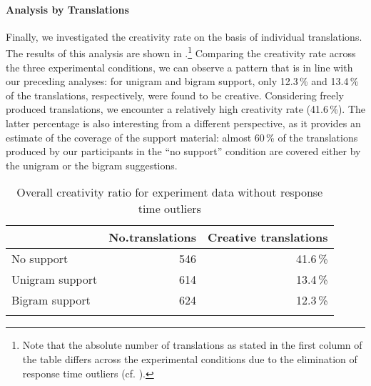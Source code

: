 \documentclass[output=paper]{LSP/langsci}
\begin{document}
\paragraph{Analysis by Translations} %

Finally, we investigated the creativity rate on the basis of
individual translations. The results of this analysis are shown in
.\footnote{Note that the
absolute number of translations as stated in the first column of 
the table differs across the experimental conditions due to the
elimination of response time outliers (cf. ).} Comparing the creativity 
rate across the three experimental conditions, we can observe a 
pattern that is in line with our preceding analyses: for unigram 
and bigram support, only 12.3\,\% and 13.4\,\% of the translations, 
respectively, were found to be creative. Considering freely produced 
translations, we encounter a relatively high creativity rate (41.6\,\%).
The latter percentage is also interesting
from a different perspective, as it provides an estimate of the
coverage of the support material: almost 60\,\% of the translations
produced by our participants in the ``no support'' condition are covered
either by the unigram or the bigram suggestions.

\begin{table}%
  \begin{tabular*}{\textwidth}{@{\extracolsep{\fill}}lrr@{}}
    \lsptoprule
    & No.\@ translations & Creative translations\\
    \midrule
    No support & 546 & 41.6\,\% \\
    Unigram support & 614 & 13.4\,\% \\
    Bigram support & 624 & 12.3\,\% \\
    \lspbottomrule
  \end{tabular*}
  \caption{Overall creativity ratio for experiment data without response time outliers}
  \label{tab:creative-translations}
\end{table}
\end{document}
